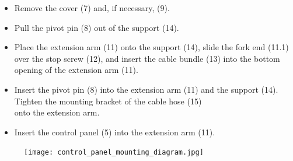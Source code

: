 
\begin{itemize}
    \item Remove the cover (7) and, if necessary, (9).
    \item Pull the pivot pin (8) out of the support (14).
    \item Place the extension arm (11) onto the support (14), slide the fork end (11.1) over the stop screw (12), and insert the cable bundle (13) into the bottom opening of the extension arm (11).
    \item Insert the pivot pin (8) into the extension arm (11) and the support (14). Tighten the mounting bracket of the cable hose (15) \\onto the extension arm.
    \item Insert the control panel (5) into the extension arm (11).
\end{itemize}

\begin{figure}[h!]
    \centering
    \texttt{[image: control\_panel\_mounting\_diagram.jpg]}
    \caption{}
    \label{fig:control_panel_mounting}
\end{figure}

